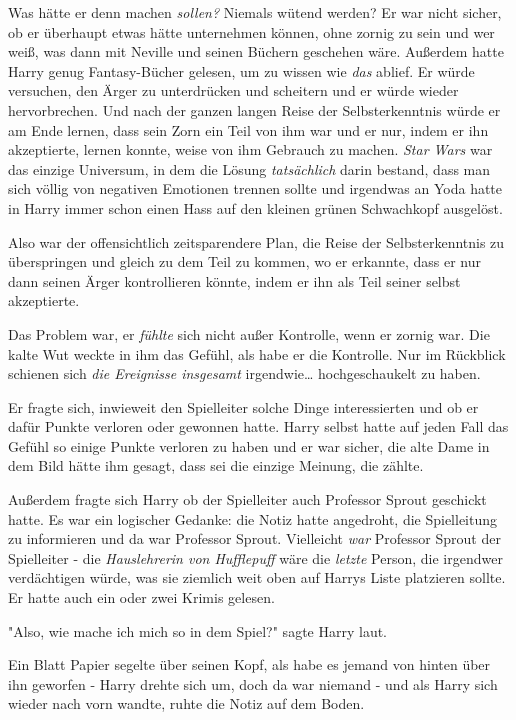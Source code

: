 {Was hätte er denn machen \emph{sollen?} Niemals wütend werden? Er war nicht sicher, ob er überhaupt etwas hätte unternehmen können, ohne zornig zu sein und wer weiß, was dann mit Neville und seinen Büchern geschehen wäre. Außerdem hatte Harry genug Fantasy-Bücher gelesen, um zu wissen wie \emph{das} ablief. Er würde versuchen, den Ärger zu unterdrücken und scheitern und er würde wieder hervorbrechen. Und nach der ganzen langen Reise der Selbsterkenntnis würde er am Ende lernen, dass sein Zorn ein Teil von ihm war und er nur, indem er ihn akzeptierte, lernen konnte, weise von ihm Gebrauch zu machen. \emph{Star Wars} war das einzige Universum, in dem die Lösung \emph{tatsächlich} darin bestand, dass man sich völlig von negativen Emotionen trennen sollte und irgendwas an Yoda hatte in Harry immer schon einen Hass auf den kleinen grünen Schwachkopf ausgelöst.

Also war der offensichtlich zeitsparendere Plan, die Reise der Selbsterkenntnis zu überspringen und gleich zu dem Teil zu kommen, wo er erkannte, dass er nur dann seinen Ärger kontrollieren könnte, indem er ihn als Teil seiner selbst akzeptierte.

Das Problem war, er \emph{fühlte} sich nicht außer Kontrolle, wenn er zornig war. Die kalte Wut weckte in ihm das Gefühl, als habe er die Kontrolle. Nur im Rückblick schienen sich \emph{die Ereignisse insgesamt} irgendwie… hochgeschaukelt zu haben.

Er fragte sich, inwieweit den Spielleiter solche Dinge interessierten und ob er dafür Punkte verloren oder gewonnen hatte. Harry selbst hatte auf jeden Fall das Gefühl so einige Punkte verloren zu haben und er war sicher, die alte Dame in dem Bild hätte ihm gesagt, dass sei die einzige Meinung, die zählte.

Außerdem fragte sich Harry ob der Spielleiter auch Professor Sprout geschickt hatte. Es war ein logischer Gedanke: die Notiz hatte angedroht, die Spielleitung zu informieren und da war Professor Sprout. Vielleicht \emph{war} Professor Sprout der Spielleiter - die \emph{Hauslehrerin von Hufflepuff} wäre die \emph{letzte} Person, die irgendwer verdächtigen würde, was sie ziemlich weit oben auf Harrys Liste platzieren sollte. Er hatte auch ein oder zwei Krimis gelesen.

"Also, wie mache ich mich so in dem Spiel?" sagte Harry laut.

Ein Blatt Papier segelte über seinen Kopf, als habe es jemand von hinten über ihn geworfen - Harry drehte sich um, doch da war niemand - und als Harry sich wieder nach vorn wandte, ruhte die Notiz auf dem Boden.

}
